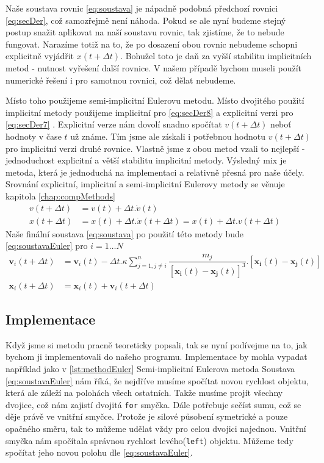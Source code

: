 Naše soustava rovnic \eqref{eq:soustava} je nápadně podobná předchozí rovnici \eqref{eq:secDer}, což samozřejmě není náhoda. Pokud se ale nyní budeme stejný postup snažit aplikovat na naší soustavu rovnic, tak zjistíme, že to nebude fungovat. Narazíme totiž na to, že po dosazení obou rovnic nebudeme schopni explicitně vyjádřit $ x(t + \Delta t) $. Bohužel toto je daň za vyšší stabilitu implicitních metod - nutnost vyřešení další rovnice. V našem případě bychom museli použít numerické řešení i pro samotnou rovnici, což dělat nebudeme.

Místo toho použijeme semi-implicitní Eulerovu metodu. Místo dvojitého použití implicitní metody použijeme implicitní pro \eqref{eq:secDer8} a explicitní verzi pro \eqref{eq:secDer7} . Explicitní verze nám dovolí snadno spočítat $ v(t + \Delta t) $ neboť hodnoty v čase $ t $ už známe. Tím jsme ale získali i potřebnou hodnotu $ v(t + \Delta t) $ pro implicitní verzi druhé rovnice. Vlastně jsme z obou metod vzali to nejlepší - jednoduchost explicitní a větší stabilitu implicitní metody. Výsledný mix je metoda, která je jednoduchá na implementaci a relativně přesná pro naše účely. Srovnání explicitní, implicitní a semi-implicitní Eulerovy metody se věnuje kapitola \ref{chap:compMethods}
\begin{align}
\label{eq:secDer7}
v(t + \Delta t)&=v(t) + \Delta t . \dot{v}(t)\\
\label{eq:secDer8}
x(t+\Delta t) &= x(t) + \Delta t. \dot{x}(t + \Delta t) = x(t) + \Delta t.v(t + \Delta t)\quad
\end{align}
Naše finální soustava \eqref{eq:soustava} po použití této metody bude \eqref{eq:soustavaEuler} pro $ i=1 \dots N $
\begin{subequations}\label{eq:soustavaEuler}
\begin{align}
\boldsymbol {v}_i(t+\Delta t) &=\boldsymbol{{v}}_i(t)  - \Delta t . \kappa \sum_{j=1,j \neq i}^{n}\dfrac{m_j}
{\left[ \boldsymbol{x_i}(t) - \boldsymbol{x_j}(t)\right] ^3} . 
\left[ \boldsymbol{x_i}(t) - \boldsymbol{x_j}(t)\right] \\
\boldsymbol {x}_i(t+\Delta t)& =\boldsymbol{{x}}_i(t)  +\boldsymbol {v}_i(t+\Delta t)
\end{align}
\end{subequations}
\subsection{Implementace}
Když jsme si metodu pracně teoreticky popsali, tak se nyní podívejme na to, jak bychom ji implementovali do našeho programu. Implementace by mohla vypadat například jako v \ref{lst:methodEuler}
{Semi-implicitní Eulerova metoda}
Soustava \eqref{eq:soustavaEuler} nám říká, že nejdříve musíme spočítat novou rychlost objektu, která ale záleží na polohách všech ostatních. Takže musíme projít všechny dvojice, což nám zajistí dvojitá \texttt{for} smyčka. Dále potřebuje sečíst sumu, což se děje právě ve vnitřní smyčce. Protože je silové působení symetrické a pouze opačného směru, tak to můžeme udělat vždy pro celou dvojici najednou.
Vnitřní smyčka nám spočítala správnou rychlost levého(\texttt{left}) objektu.
Můžeme tedy spočítat jeho novou polohu dle \eqref{eq:soustavaEuler}.

